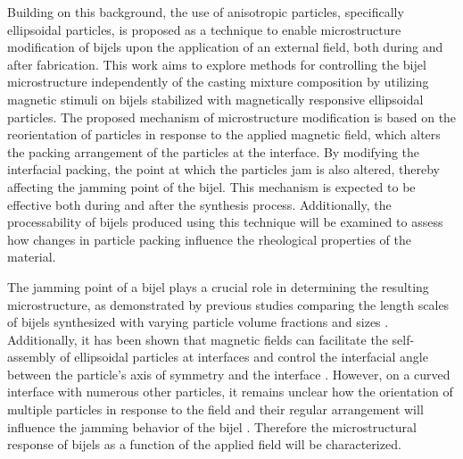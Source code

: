Building on this background, the use of anisotropic particles, specifically ellipsoidal particles, is proposed as a technique to enable microstructure modification 
of bijels upon the application 
of an external field, both during and after fabrication. This work aims to explore methods for controlling the bijel microstructure independently of the casting 
mixture composition by utilizing magnetic stimuli on bijels stabilized with magnetically responsive ellipsoidal particles.  
The proposed mechanism of microstructure modification is based on the reorientation of particles in response to the applied magnetic field, which alters the 
packing arrangement of the particles at the interface. By modifying the interfacial packing, the point at which the particles jam is also altered, thereby 
affecting the jamming point of the bijel. This mechanism is expected to be effective both during and after the synthesis process. Additionally, the 
processability of bijels produced using this technique will be examined to assess how changes in particle packing influence the rheological properties of 
the material.  




The jamming point of a bijel plays a crucial role in determining the resulting microstructure, as demonstrated by previous studies comparing the length scales 
of bijels synthesized with varying particle volume fractions and sizes \cite{jansen_bijels_2011, reeves_particle-size_2015}. Additionally, it has been shown 
that magnetic fields can facilitate the self-assembly of ellipsoidal particles at interfaces and control the interfacial angle between the particle's axis 
of symmetry and the interface \cite{davies_interface_2014, davies_assembling_2014}. However, on a curved interface with numerous other particles, it remains 
unclear how the orientation of multiple particles in response to the field and their regular arrangement will influence the jamming behavior of the bijel 
\cite{bresme_orientational_2007, davies_interface_2014}. Therefore the microstructural response of bijels as a function of the applied field will be 
characterized. 

